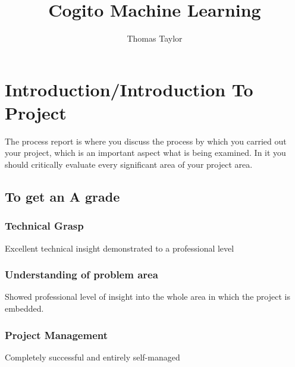 \documentclass[runningheads,a4paper]{llncs}
\begin{document}
%
%

\title{Cogito Machine Learning}
\titlerunning{}
\author{Thomas Taylor\\ \mail}


%
%

\setcounter{tocdepth}{3}
\tableofcontents
\newpage

%
%


\section{Introduction/Introduction To Project}

The process report is where you discuss the process by which you carried out your project, which is an important aspect what is being examined. In it you should critically evaluate every significant area of your project area.

\subsection{To get an A grade}

	\subsubsection{Technical Grasp} 
	Excellent technical insight demonstrated to a professional level
	
	\subsubsection{Understanding of problem area}
	Showed professional level of insight into the whole area in which the project is embedded. 
	
	\subsubsection{Project Management}
	Completely successful and entirely self-managed
	
\end{document}
